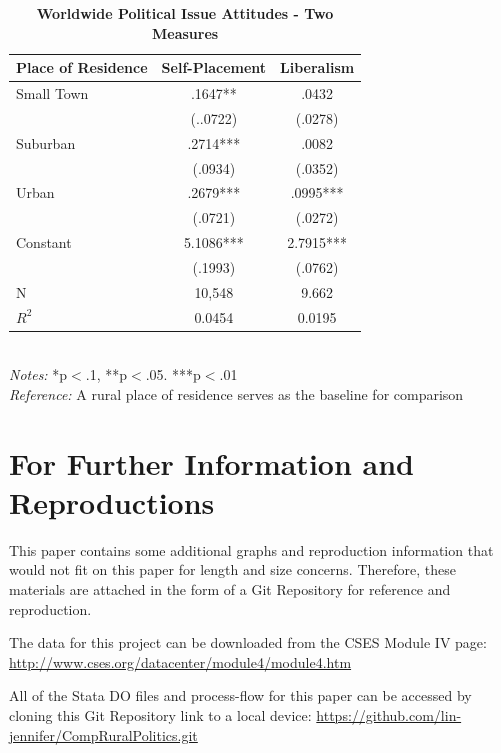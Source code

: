 \documentclass[12pt, titlepage]{article}
\newcommand\e{\emph}
\newcommand\tb{\textbf}
\begin{document}
\begin{appendices}
\begin{singlespace}
	\begin{table}[H]
		\centering
		\caption{\tb{Worldwide Political Issue Attitudes - Two Measures}}
		\begin{tabulary}{\linewidth}{l c c}
			\\
			\hline
			\tb{Place of Residence}&\tb{Self-Placement}&\tb{Liberalism} \\
			\hline
			Small Town&.1647**&.0432  \\    
			& (..0722) &(.0278)  \\
			Suburban & .2714*** &.0082\\ 
			& (.0934) &(.0352) \\
			Urban   & .2679*** &.0995***  \\
			& (.0721)  &(.0272)  \\
			Constant   & 5.1086*** &2.7915*** \\
			&(.1993)&(.0762)  \\
			N  & 10,548 &9.662  \\
			$R^2$	& 0.0454&0.0195 \\
			\hline                                       
		\end{tabulary}
		\\
		\e{Notes:} *p$<$.1, **p$<$.05. ***p$<$.01 \\
		\e{Reference:} A rural place of residence serves as the baseline for comparison
		\label{table102}
	\end{table}
\end{singlespace}
\clearpage

\section{For Further Information and Reproductions}
\label{Online}

This paper contains some additional graphs and reproduction information that would not fit on this paper for length and size concerns. Therefore, these materials are attached in the form of a Git Repository for reference and reproduction.

The data for this project can be downloaded from the CSES Module IV page: \url{http://www.cses.org/datacenter/module4/module4.htm}

All of the Stata DO files and process-flow for this paper can be accessed by cloning this Git Repository link to a local device: \url{https://github.com/lin-jennifer/CompRuralPolitics.git}


\end{appendices}
\end{document}
